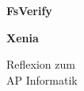 \begin{center}
	{
		\vspace*{1cm}
		
		\Huge
		\textbf{FsVerify}
		
		\vspace{2cm}
		
		\textbf{Xenia}
		
		\vspace{1.5cm}
		
		Reflexion zum\\
		AP Informatik
		
		\vfill
	}
\end{center}

